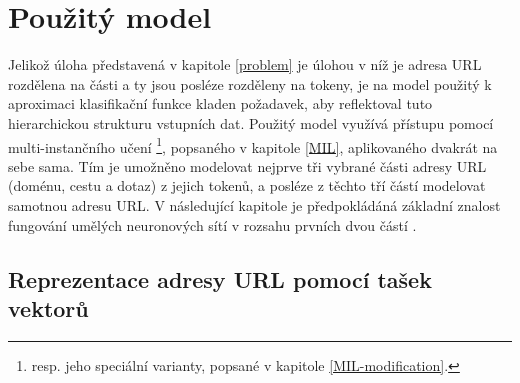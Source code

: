 \chapter{Použitý model}\label{model}

Jelikož úloha představená v kapitole \ref{problem} je úlohou v níž je adresa URL rozdělena na části a ty jsou posléze rozděleny na tokeny, je na model použitý k aproximaci klasifikační funkce kladen požadavek, aby reflektoval tuto hierarchickou strukturu vstupních dat. Použitý model využívá přístupu pomocí multi-instančního učení \footnote{resp. jeho speciální varianty, popsané v kapitole \ref{MIL-modification}.}, popsaného v kapitole \ref{MIL}, aplikovaného dvakrát na sebe sama. Tím je umožněno modelovat nejprve tři vybrané části adresy URL (doménu, cestu a dotaz) z jejich tokenů, a posléze z těchto tří částí modelovat samotnou adresu URL. V následující kapitole je předpokládáná základní znalost fungování umělých neuronových sítí v rozsahu prvních dvou částí \cite{goodfellow_deep_2016}.

\section{Reprezentace adresy URL pomocí tašek vektorů}\label{URL_MIL_representation}

